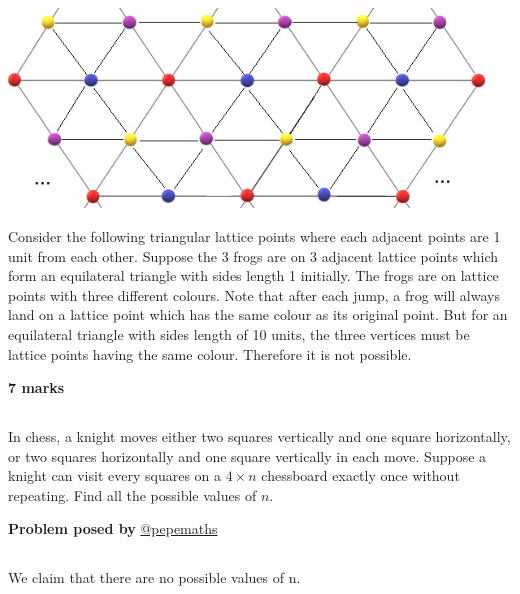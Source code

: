 \documentclass[12pt]{article}
\begin{document}
\subsection*{}
\begin{center}
    \includegraphics[width = 14cm]{Figure2.1.png}
\end{center}
Consider the following triangular lattice points where each adjacent points are 1 unit from each other. Suppose the 3 frogs are on 3 adjacent lattice points which form an equilateral triangle with sides length 1 initially. The frogs are on lattice points with three different colours. Note that after each jump, a frog will always land on a lattice point which has the same colour as its original point. But for an equilateral triangle with sides length of 10 units, the three vertices must be lattice points having the same colour. Therefore it is not possible.
\begin{flushright}
\textbf{7 marks}
\end{flushright}




\subsection*{}
In chess, a knight moves either two squares vertically and one square horizontally, or two squares horizontally and one square vertically in each move. Suppose a knight can visit every squares on a $4 \times n$ chessboard exactly once without repeating. Find all the possible values of $n$.

\begin{flushright}
\textbf{Problem posed by}
\textcolor{RoyalBlue2}{\href{https://www.instagram.com/pepemaths/}{@pepemaths}}
\end{flushright}



\subsection*{}
We claim that there are no possible values of n.
 
\end{document}
